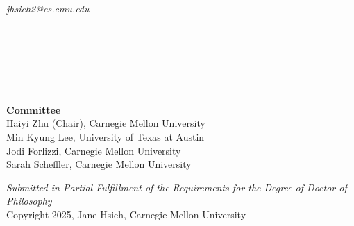 \begin{titlepage}
    \begin{addmargin}[-1cm]{-3cm}
    \begin{center}
        \large  

        \hfill

        \vfill

        \begingroup            \color{Maroon}\spacedallcaps{\myTitle} \spacedallcaps{\mySubtitle} \\ \bigskip
        \endgroup

        \spacedlowsmallcaps{\myName} \\
        \textit{jhsieh2@cs.cmu.edu} \\
        \myTime\ -- \myVersion
        \vfill

        


        \myDepartment \\                      
        \mySchool \\
        \myUni \\ 
        \myLocation \\
        \bigskip

        \textbf{Committee} \\
        Haiyi Zhu (Chair), Carnegie Mellon University \\
        Min Kyung Lee, University of Texas at Austin \\
        Jodi Forlizzi, Carnegie Mellon University \\
        Sarah Scheffler, Carnegie Mellon University 
        \vfill

        \textit{Submitted in Partial Fulfillment of the Requirements for the Degree of Doctor of Philosophy} \\
        Copyright 2025, Jane Hsieh, Carnegie Mellon University

    \end{center}  
  \end{addmargin}       
\end{titlepage}   